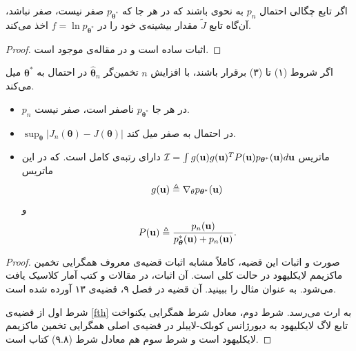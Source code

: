 \documentclass[oneside]{thesis}
\begin{document}
\begin{theorem}
	\label{fth}
	اگر تابع چگالی احتمال
	$p_n$
	به نحوی باشند که در هر جا که 
	$p_{\boldsymbol{\theta}^*}$
	صفر نیست، صفر نباشد، آن‌گاه تابع 
	$\tilde{J}$
	مقدار بیشینه‌ی خود را در 
	$f = \ln p_{\boldsymbol{\theta}^*}$
	اخذ می‌کند.
	
\end{theorem}

\begin{proof}
اثبات ساده است و در  
مقاله‌ی
\cite{NCE}
موجود است.
\end{proof}

\begin{theorem}
	 اگر شروط (۱) تا (۳) برقرار باشند، با افزایش 
$n$
تخمین‌گر
$\hat{\boldsymbol\theta}_n$
در احتمال به 
$\boldsymbol{\theta}^*$
میل می‌کند.

\begin{itemize}
\item 
$p_n$
در هر جا 
$p_{\boldsymbol{\theta}^*}$
ناصفر است، صفر نیست.

\item 
$\sup_{\boldsymbol{\boldsymbol\theta}} |J_n(\boldsymbol\theta) - J(\boldsymbol{\theta})|$
در احتمال به صفر میل کند.

\item 
ماتریس
$\mathcal{I} = \int g(\mathbf{u}) g(\mathbf{u})^T P(\mathbf{u}) p_{\boldsymbol{\theta}^*}(\mathbf{u}) d\mathbf{u}$
دارای رتبه‌ی کامل است. که در این ماتریس
\begin{equation}
g(\mathbf{u}) \triangleq \nabla_\theta p_{\boldsymbol{\theta}^*}(\mathbf{u})
\end{equation}
و
\begin{equation}
P(\mathbf{u}) \triangleq \frac{p_n(\mathbf{u})}{p_{\boldsymbol{\theta}}^*(\mathbf{u}) + p_n(\mathbf{u})}.
\end{equation}

\end{itemize}
\end{theorem}

\begin{proof}
صورت و اثبات این قضیه، کاملاً مشابه اثبات قضیه‌ی معروف همگرایی تخمین ماکزیمم لایکلیهود در حالت کلی است. آن اثبات، در مقالات و کتب آمار کلاسیک یافت می‌شود. به عنوان مثال 
\cite{wasserman}
را ببینید.  آن قضیه در فصل ۹، قضیه‌ی ۱۳ آورده شده است.

 شرط اول  از قضیه‌ی
\eqref{fth}
به ارث می‌رسد. شرط دوم، معادل شرط همگرایی یکنواخت
تابع لاگ لایکلیهود به دیورژانس کوبلک-لایبلر در قضیه‌ی اصلی همگرایی تخمین ماکزیمم لایکلیهود است و شرط سوم هم معادل شرط (۹.۸) کتاب 
\cite{wasserman}
است.
\end{proof}
\end{document}
